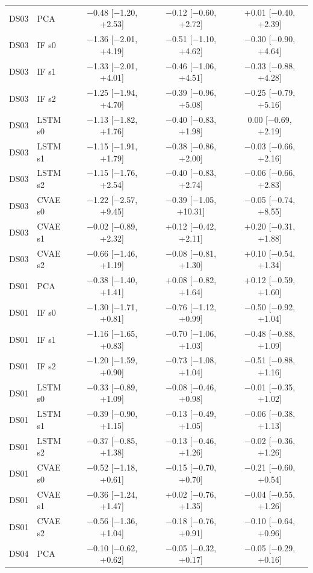 \documentclass[10pt]{article}
\begin{document}
{\begin{longtable}{llccc}
DS03 & PCA & −0.48 [−1.20, +2.53] & −0.12 [−0.60, +2.72] & +0.01 [−0.40, +2.39] \\
DS03 & IF s0 & −1.36 [−2.01, +4.19] & −0.51 [−1.10, +4.62] & −0.30 [−0.90, +4.64] \\
DS03 & IF s1 & −1.33 [−2.01, +4.01] & −0.46 [−1.06, +4.51] & −0.33 [−0.88, +4.28] \\
DS03 & IF s2 & −1.25 [−1.94, +4.70] & −0.39 [−0.96, +5.08] & −0.25 [−0.79, +5.16] \\
DS03 & LSTM s0 & −1.13 [−1.82, +1.76] & −0.40 [−0.83, +1.98] & 0.00 [−0.69, +2.19] \\
DS03 & LSTM s1 & −1.15 [−1.91, +1.79] & −0.38 [−0.86, +2.00] & −0.03 [−0.66, +2.16] \\
DS03 & LSTM s2 & −1.15 [−1.76, +2.54] & −0.40 [−0.83, +2.74] & −0.06 [−0.66, +2.83] \\
DS03 & CVAE s0 & −1.22 [−2.57, +9.45] & −0.39 [−1.05, +10.31] & −0.05 [−0.74, +8.55] \\
DS03 & CVAE s1 & −0.02 [−0.89, +2.32] & +0.12 [−0.42, +2.11] & +0.20 [−0.31, +1.88] \\
DS03 & CVAE s2 & −0.66 [−1.46, +1.19] & −0.08 [−0.81, +1.30] & +0.10 [−0.54, +1.34] \\
\midrule
DS01 & PCA & −0.38 [−1.40, +1.41] & +0.08 [−0.82, +1.64] & +0.12 [−0.59, +1.60] \\
DS01 & IF s0 & −1.30 [−1.71, +0.81] & −0.76 [−1.12, +0.99] & −0.50 [−0.92, +1.04] \\
DS01 & IF s1 & −1.16 [−1.65, +0.83] & −0.70 [−1.06, +1.03] & −0.48 [−0.88, +1.09] \\
DS01 & IF s2 & −1.20 [−1.59, +0.90] & −0.73 [−1.08, +1.04] & −0.51 [−0.88, +1.16] \\
DS01 & LSTM s0 & −0.33 [−0.89, +1.09] & −0.08 [−0.46, +0.98] & −0.01 [−0.35, +1.02] \\
DS01 & LSTM s1 & −0.39 [−0.90, +1.15] & −0.13 [−0.49, +1.05] & −0.06 [−0.38, +1.13] \\
DS01 & LSTM s2 & −0.37 [−0.85, +1.38] & −0.13 [−0.46, +1.26] & −0.02 [−0.36, +1.26] \\
DS01 & CVAE s0 & −0.52 [−1.18, +0.61] & −0.15 [−0.70, +0.70] & −0.21 [−0.60, +0.54] \\
DS01 & CVAE s1 & −0.36 [−1.24, +1.47] & +0.02 [−0.76, +1.35] & −0.04 [−0.55, +1.26] \\
DS01 & CVAE s2 & −0.56 [−1.36, +1.04] & −0.18 [−0.76, +0.91] & −0.10 [−0.64, +0.96] \\
\midrule
DS04 & PCA & −0.10 [−0.62, +0.62] & −0.05 [−0.32, +0.17] & −0.05 [−0.29, +0.16] \\

\end{longtable}}
\end{document}
